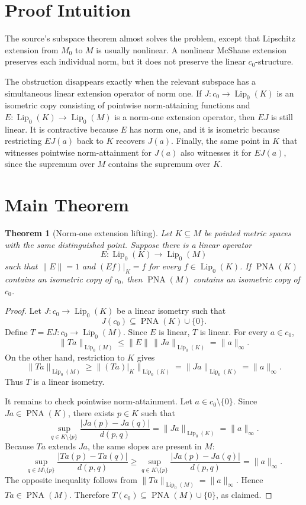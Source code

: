 \documentclass[11pt]{article}
\newtheorem{theorem}{Theorem}
\newcommand{\Lip}{\operatorname{Lip}_0}
\newcommand{\PNA}{\operatorname{PNA}}
\begin{document}
\section*{Proof Intuition}

The source's subspace theorem almost solves the problem, except that
Lipschitz extension from \(M_0\) to \(M\) is usually nonlinear.  A nonlinear
McShane extension preserves each individual norm, but it does not preserve the
linear \(c_0\)-structure.

The obstruction disappears exactly when the relevant subspace has a
simultaneous linear extension operator of norm one.  If \(J:c_0\to\Lip(K)\)
is an isometric copy consisting of pointwise norm-attaining functions and
\(E:\Lip(K)\to\Lip(M)\) is a norm-one extension operator, then \(EJ\) is still
linear.  It is contractive because \(E\) has norm one, and it is isometric
because restricting \(EJ(a)\) back to \(K\) recovers \(J(a)\).  Finally, the
same point in \(K\) that witnesses pointwise norm-attainment for \(J(a)\) also
witnesses it for \(EJ(a)\), since the supremum over \(M\) contains the
supremum over \(K\).

\section*{Main Theorem}

\begin{theorem}[Norm-one extension lifting]
\label{thm:lifting}
Let \(K\subseteq M\) be pointed metric spaces with the same distinguished
point.  Suppose there is a linear operator
\[
  E:\Lip(K)\longrightarrow \Lip(M)
\]
such that \(\|E\|=1\) and \((Ef)|_K=f\) for every \(f\in\Lip(K)\).  If
\(\PNA(K)\) contains an isometric copy of \(c_0\), then \(\PNA(M)\) contains
an isometric copy of \(c_0\).
\end{theorem}

\begin{proof}
Let \(J:c_0\to \Lip(K)\) be a linear isometry such that
\[
  J(c_0)\subseteq \PNA(K)\cup\{0\}.
\]
Define \(T=EJ:c_0\to \Lip(M)\).  Since \(E\) is linear, \(T\) is linear.  For
every \(a\in c_0\),
\[
  \|T a\|_{\Lip(M)} \le \|E\|\,\|J a\|_{\Lip(K)}=\|a\|_\infty.
\]
On the other hand, restriction to \(K\) gives
\[
  \|T a\|_{\Lip(M)}
  \ge \|(T a)|_K\|_{\Lip(K)}
  = \|J a\|_{\Lip(K)}
  = \|a\|_\infty.
\]
Thus \(T\) is a linear isometry.

It remains to check pointwise norm-attainment.  Let \(a\in c_0\setminus\{0\}\).
Since \(J a\in \PNA(K)\), there exists \(p\in K\) such that
\[
  \sup_{q\in K\setminus\{p\}}
  \frac{|J a(p)-J a(q)|}{d(p,q)}
  =
  \|J a\|_{\Lip(K)}
  =
  \|a\|_\infty.
\]
Because \(T a\) extends \(J a\), the same slopes are present in \(M\):
\[
  \sup_{q\in M\setminus\{p\}}
  \frac{|T a(p)-T a(q)|}{d(p,q)}
  \ge
  \sup_{q\in K\setminus\{p\}}
  \frac{|J a(p)-J a(q)|}{d(p,q)}
  =
  \|a\|_\infty.
\]
The opposite inequality follows from \(\|T a\|_{\Lip(M)}=\|a\|_\infty\).
Hence \(T a\in\PNA(M)\).  Therefore \(T(c_0)\subseteq\PNA(M)\cup\{0\}\), as
claimed.
\end{proof}
\end{document}
